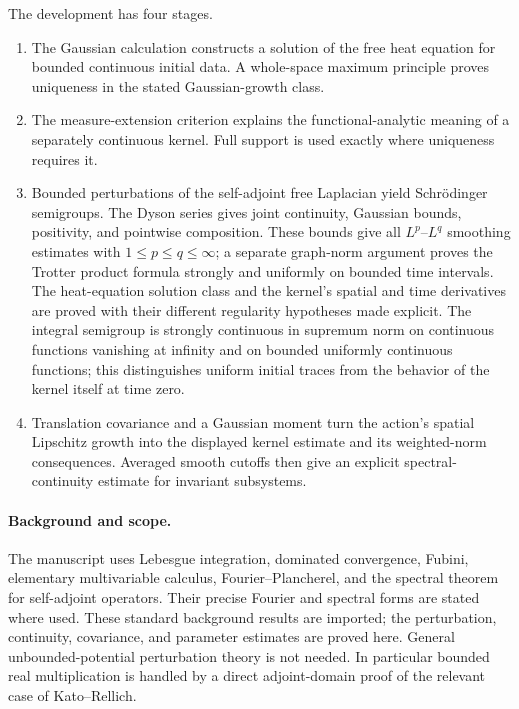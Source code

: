The development has four stages.
\begin{enumerate}
\item The Gaussian calculation constructs a solution of the free heat
equation for bounded continuous initial data. A whole-space maximum
principle proves uniqueness in the stated Gaussian-growth class.
\item The measure-extension criterion explains the functional-analytic
meaning of a separately continuous kernel. Full support is used exactly
where uniqueness requires it.
\item Bounded perturbations of the self-adjoint free Laplacian yield
Schr\"odinger semigroups. The Dyson series gives joint continuity,
Gaussian bounds, positivity, and pointwise composition. These bounds
give all $L^p$--$L^q$ smoothing estimates with $1\leq p\leq q\leq\infty$;
a separate graph-norm argument proves the Trotter product formula
strongly and uniformly on bounded time intervals. The heat-equation
solution class and the kernel's spatial and time derivatives are proved
with their different regularity hypotheses made explicit. The integral
semigroup is strongly continuous in supremum norm on continuous
functions vanishing at infinity and on bounded uniformly continuous
functions; this distinguishes uniform initial traces from the behavior
of the kernel itself at time zero.
\item Translation covariance and a Gaussian moment turn the action's
spatial Lipschitz growth into the displayed kernel estimate and its
weighted-norm consequences. Averaged smooth cutoffs then give an
explicit spectral-continuity estimate for invariant subsystems.
\end{enumerate}

\paragraph{Background and scope.}
The manuscript uses Lebesgue integration, dominated convergence, Fubini,
elementary multivariable calculus, Fourier--Plancherel, and the spectral
theorem for self-adjoint operators. Their precise Fourier and spectral
forms are stated where used. These standard background results are
imported; the perturbation, continuity, covariance, and parameter estimates
are proved here. General unbounded-potential perturbation theory is not
needed. In particular bounded real multiplication is handled by a direct
adjoint-domain proof of the relevant case of Kato--Rellich.

